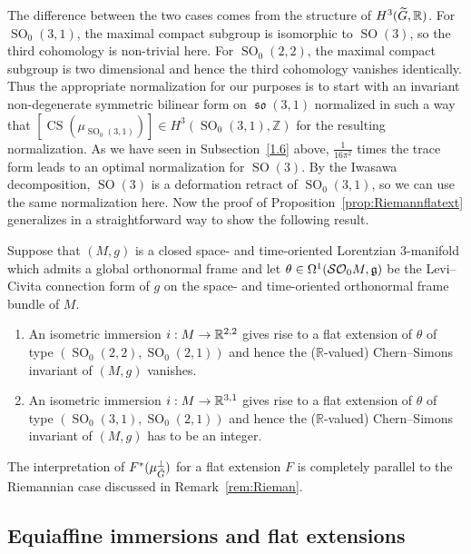 \documentclass[AHL,Unicode,longabstracts]{cedram}
\newcommand{\Om}{\Omega}
\DeclareMathOperator{\CS}{CS}
\DeclareMathOperator{\SO}{SO}
\DeclareMathOperator{\fkso}{\mathfrak{so}}
\newcommand*{\R}{\mathbb{R}}
\newcommand{\Z}{\mathbb{Z}}
\newcommand{\fkg}{\mathfrak{g}}
\newcommand{\clSO}{\mathcal{SO}}
\renewcommand*{\to}{\mathchoice{\longrightarrow}{\rightarrow}{\rightarrow}{\rightarrow}}
\let\oldtilde\tilde
\renewcommand*{\tilde}[1]{\mathchoice{\widetilde{#1}}{\widetilde{#1}}{\oldtilde{#1}}{\oldtilde{#1}}}
\newcommand*{\R}{\mathbb{R}}
\begin{document}
The difference between the two cases comes from the structure of $H^3(\tilde G,\R)$. For $\SO_0(3,1)$, the maximal compact subgroup is isomorphic to $\SO(3)$, so the third cohomology is non-trivial here. For $\SO_0(2,2)$, the maximal compact subgroup is two dimensional and hence the third cohomology vanishes identically. Thus the appropriate normalization for our purposes is to start with an invariant non-degenerate symmetric bilinear form on $\fkso(3,1)$ normalized in such a way that $[\CS(\mu_{\SO_0(3,1)})]\in H^3(\SO_0(3,1),\Z)$ for the resulting normalization. As we have seen in Subsection~\ref{1.6} above, $\frac{1}{16\pi^2}$ times the trace form leads to an optimal normalization for $\SO(3)$. By the Iwasawa decomposition, $\SO(3)$ is a deformation retract of $\SO_0(3,1)$, so we can use the same normalization here. Now the proof of Proposition~\ref{prop:Riemannflatext} generalizes in a straightforward way to show the following result.

\begin{prop}\label{prop:Lorentz-flat-ext}
Suppose that $(M,g)$ is a closed space- and time-oriented Lorentzian $3$-ma\-ni\-fold which admits a global orthonormal frame and let $\theta\in\linebreak\Om^1(\clSO _0M,\fkg)$ be the Levi--Civita connection form of $g$ on the space- and time-oriented orthonormal frame bundle of $M$.
\begin{enumerate}
\item\label{prop6.7.1} An isometric immersion $i: M\to \R^{2,2}$ gives rise to a flat extension of $\theta$ of type $(\SO_0(2,2),\SO_0(2,1))$ and hence the ($\R$-valued) Chern--Simons invariant of $(M,g)$ vanishes.

\item\label{prop6.7.2} An isometric immersion $i: M\to \R^{3,1}$ gives rise to a flat extension of $\theta$ of type $(\SO_0(3,1),\SO_0(2,1))$ and hence the ($\R$-valued) Chern--Simons invariant of $(M,g)$ has to be an integer.
\end{enumerate}
\end{prop}

The interpretation of $F^*(\mu_{\tilde G}^\perp)$ for a flat extension $F$ is completely parallel to the Riemannian case discussed in Remark~\ref{rem:Rieman}.

\subsection{Equiaffine immersions and flat extensions}\label{1.8}
\end{document}
